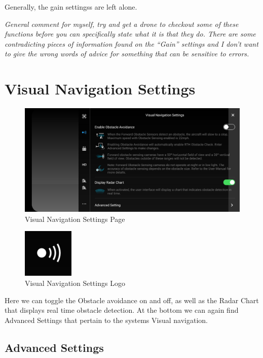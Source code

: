 \documentclass[
]{book}
\begin{document}
Generally, the gain settingss are left alone.

\emph{General comment for myself, try and get a drone to checkout some of these functions before you can specifically state what it is that they do. There are some contradicting pieces of information found on the ``Gain'' settings and I don't want to give the wrong words of advice for something that can be sensitive to errors.}

\hypertarget{visual-navigation-settings}{%
\section{Visual Navigation Settings}\label{visual-navigation-settings}}

\begin{figure}
\centering
\includegraphics{images/VN/DJI-VisualNavigationSettings.jpg}
\caption{Visual Navigation Settings Page}
\end{figure}

\begin{figure}
\centering
\includegraphics{images/VN/DJI-VNLogo.jpg}
\caption{Visual Navigation Settings Logo}
\end{figure}

Here we can toggle the Obstacle avoidance on and off, as well as the Radar Chart that displays real time obstacle detection. At the bottom we can again find Advanced Settings that pertain to the systems Visual navigation.

\hypertarget{advanced-settings-1}{%
\subsection{Advanced Settings}\label{advanced-settings-1}}
\end{document}

